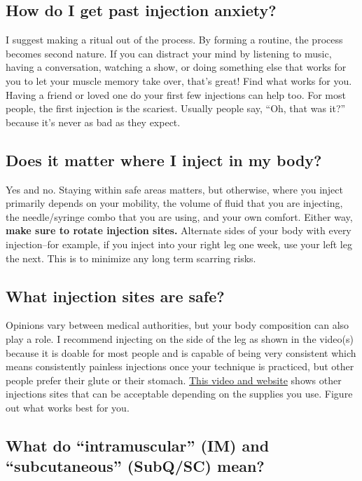 \documentclass{article}
\begin{document}
{{\subsection{How do I get past injection anxiety?}

I suggest making a ritual out of the process. By forming a routine, the process becomes second nature. If you can distract your mind by listening to music, having a conversation, watching a show, or doing something else that works for you to let your muscle memory take over, that’s great! Find what works for you. Having a friend or loved one do your first few injections can help too. For most people, the first injection is the scariest. Usually people say, “Oh, that was it?” because it’s never as bad as they expect.

\subsection{Does it matter where I inject in my body?}

Yes and no. Staying within safe areas matters, but otherwise, where you inject primarily depends on your mobility, the volume of fluid that you are injecting, the needle/syringe combo that you are using, and your own comfort. Either way, \textbf{make sure to rotate injection sites.} Alternate sides of your body with every injection–for example, if you inject into your right leg one week, use your left leg the next. This is to minimize any long term scarring risks.

\subsection{What injection sites are safe?}

Opinions vary between medical authorities, but your body composition can also play a role. I recommend injecting on the side of the leg as shown in the video(s) because it is doable for most people and is capable of being very consistent which means consistently painless injections once your technique is practiced, but other people prefer their glute or their stomach. \href{https://vertisis.com/articles/how-to-self-administer-a-subcutaneous-injection}{This video and website} shows other injections sites that can be acceptable depending on the supplies you use. Figure out what works best for you.

\subsection{What do “intramuscular” (IM) and “subcutaneous” (SubQ/SC) mean?}

}}
\end{document}
